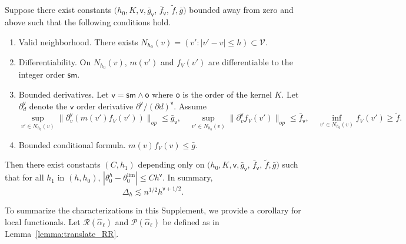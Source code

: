 \begin{lemma}\label{lemma:approx}
Suppose there exist constants $(h_0,K, \mathsf{v}, \bar g_{\mathsf{v}}$,  $\bar f_{\mathsf{v}}$, $\tilde{f}, \bar{g})$ bounded away from zero and above such that the following conditions hold.
\begin{enumerate}
  \item Valid neighborhood. There exists $N_{h_0}(v)=(v':|v'-v|\leq h)\subset \mathcal{V}$.
    \item Differentiability. On $N_{h_0}(v)$, $m(v')$ and $f_V(v')$ are differentiable to the integer order $\mathsf{sm}$.
    \item Bounded derivatives. Let $\mathsf{v}= \mathsf{sm} \wedge \mathsf{o}$ where $\mathsf{o}$ is the order of the kernel $K$. Let $\partial^\mathsf{v}_d$ denote the $\mathsf{v}$ order derivative $\partial^{\mathsf{v}}/(\partial d)^{\mathsf{v}}$. Assume
    $$
\sup_{ v' \in N_{h_0}(v)}  \| \partial^{\mathsf{v}}_v (m(v') f_V(v')) \|_{op} \leq \bar g_{\mathsf{v}}, \quad \sup_{ v' \in N_{h_0}(v) } \|\partial^{\mathsf{v}}_v f_V(v')  \|_{op} \leq \bar f_{\mathsf{v}},
 \quad  \inf_{ v' \in N_{h_0}(v) } f_V(v') \geq \tilde{f}.
$$ 
\item Bounded conditional formula.
$
m(v)f_V(v)\leq \bar{g}.
$
\end{enumerate}
Then there exist constants $(C,h_1)$ depending only on $(h_0,K, \mathsf{v}, \bar g_{\mathsf{v}}$,  $\bar f_{\mathsf{v}}$, $\tilde{f}, \bar{g})$ such that for all $h_1$ in $(h,h_0)$, $|\theta_0^h-\theta_0^{\lim}|\leq C h^\mathsf{v}.$
In summary,
$$
\Delta_h \lesssim n^{1/2} h^{\mathsf{v}+1/2}.
$$
\end{lemma}

To summarize the characterizations in this Supplement, we provide a corollary for local functionals. Let $\mathcal{R}(\hat{\alpha}_{\ell})$ and $\mathcal{P}(\hat{\alpha}_{\ell})$ be defined as in Lemma~\ref{lemma:translate_RR}.

